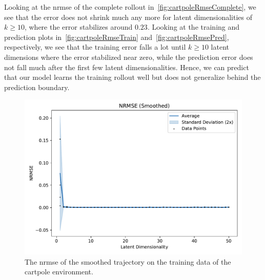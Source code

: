 			Looking at the \ac{nrmse} of the complete rollout in~\autoref{fig:cartpoleRmseComplete}, we see that the error does not shrink much any more for latent dimensionalities of \( k \geq 10 \), where the error stabilizes around \(0.23\). Looking at the training and prediction plots in~\autoref{fig:cartpoleRmseTrain} and~\autoref{fig:cartpoleRmsePred}, respectively, we see that the training error falls a lot until \( k \geq 10 \) latent dimensions where the error stabilized near zero, while the prediction error does not fall much after the first few latent dimensionalities. Hence, we can predict that our model learns the training rollout well but does not generalize behind the prediction boundary.

			\begin{figure}
				\centering
				\includegraphics[width=0.7\linewidth]{figures/results/cartpole-gym/latent-dim/comparison-rmse-smoothed-normalized-mean-vs-latent-dim.pdf}
				\caption{The \ac{nrmse} of the smoothed trajectory on the training data of the cartpole environment.}
				\label{fig:cartpoleRmseSmoothed}
			\end{figure}

